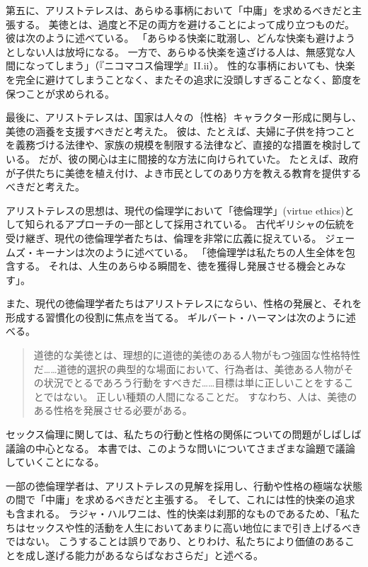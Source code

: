 \documentclass[paper=a4,book,openany]{jlreq}
\begin{document}
第五に、アリストテレスは、あらゆる事柄において「中庸」を求めるべきだと主張する。
美徳とは、過度と不足の両方を避けることによって成り立つものだ。
彼は次のように述べている。
「あらゆる快楽に耽溺し、どんな快楽も避けようとしない人は放埒になる。
一方で、あらゆる快楽を遠ざける人は、無感覚な人間になってしまう」（『ニコマコス倫理学』II.ii）。
性的な事柄においても、快楽を完全に避けてしまうことなく、またその追求に没頭しすぎることなく、節度を保つことが求められる。

最後に、アリストテレスは、国家は人々の｛性格｝{キャラクター}形成に関与し、美徳の涵養を支援すべきだと考えた。
彼は、たとえば、夫婦に子供を持つことを義務づける法律や、家族の規模を制限する法律など、直接的な措置を検討している。
だが、彼の関心は主に間接的な方法に向けられていた。
たとえば、政府が子供たちに美徳を植え付け、よき市民としてのあり方を教える教育を提供するべきだと考えた。

アリストテレスの思想は、現代の倫理学において「徳倫理学」(virtue ethics)として知られるアプローチの一部として採用されている。
古代ギリシャの伝統を受け継ぎ、現代の徳倫理学者たちは、倫理を非常に広義に捉えている。
ジェームズ・キーナンは次のように述べている。
「徳倫理学は私たちの人生全体を包含する。
それは、人生のあらゆる瞬間を、徳を獲得し発展させる機会とみなす」\citep[p.185]{keenan05:_virtue}。

また、現代の徳倫理学者たちはアリストテレスにならい、性格の発展と、それを形成する習慣化の役割に焦点を当てる。
ギルバート・ハーマンは次のように述べる。

\begin{quote}
  道徳的な美徳とは、理想的に道徳的美徳のある人物がもつ強固な性格特性だ……道徳的選択の典型的な場面において、行為者は、美徳ある人物がその状況でとるであろう行動をすべきだ……目標は単に正しいことをすることではない。
正しい種類の人間になることだ。
すなわち、人は、美徳のある性格を発展させる必要がある。
\citep[][pp.119-120]{harman99:_virtue_ethic_charac_trait}
\end{quote}

セックス倫理に関しては、私たちの行動と性格の関係についての問題がしばしば議論の中心となる。
本書では、このような問いについてさまざまな論題で議論していくことになる。

一部の徳倫理学者は、アリストテレスの見解を採用し、行動や性格の極端な状態の間で「中庸」を求めるべきだと主張する。
そして、これには性的快楽の追求も含まれる。
ラジャ・ハルワニは、性的快楽は刹那的なものであるため、「私たちはセックスや性的活動を人生においてあまりに高い地位にまで引き上げるべきではない。
こうすることは誤りであり、とりわけ、私たちにより価値のあることを成し遂げる能力があるならばなおさらだ」と述べる\citep[p.183]{halwani10:_philos_love_sex_marriag}。
\end{document}
